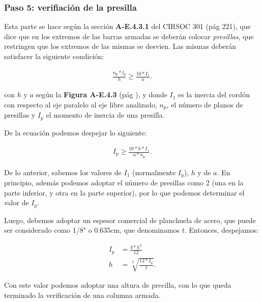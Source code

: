\documentclass[../main.tex]{subfiles}
\begin{document}
\subsubsection{Paso 5: verifiación de la presilla}

Esta parte se hace según la sección \textbf{A-E.4.3.1} del CIRSOC 301 (pág 221),
que dice que en los extremos de las barras armadas se deberán colocar
\textit{presillas}, que restringen que los extremos de las mismas se desvien. Las
mismas deberán satisfacer la siguiente condición:

\begin{align*}
  \frac{n_p * l_p}{h} \geq \frac{10 * I_1}{a}
.\end{align*}

con $h$ y $a$ según la  \textbf{Figura A-E.4.3} (pág ), y donde $I_1$ es la 
inercia del cordón con respecto al eje paralelo al eje libre analizado,  $n_p$,
el número  de planos de presillas y $I_p$ el momento de inercia de una presilla.

De la ecuación podemos despejar lo siguiente:

\begin{align*}
  I_p \geq \frac{10 * h * I_1}{a * n_p}
.\end{align*}

De lo anterior, sabemos los valores de $I_1$ (normalmente $I_y$), $h$ y de $a$.
En principio, además podemos adoptar el número de presillas como 2 (una en la
parte inferior, y otra en la parte superior), por lo que podemos determinar el
valor de $I_p$.

Luego, debemos adoptar un espesor comercial de planchuela de acero, que puede
ser considerado como 1/8" o 0.635cm, que denominamos $t$. Entonces, despejamos:

 \begin{align*}
  I_p  &= \frac{b*h^3}{12} \\[5pt]
  h &= \sqrt[3]{\frac{12*I_p}{t}} 
.\end{align*}

Con este valor podemos adoptar una altura de precilla, con lo que queda
terminado la verificación de una columna armada.
\end{document}
